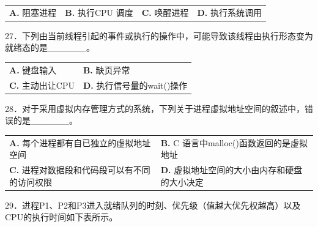 \documentclass[UTF8,11pt]{ctexart}
\begin{document}
\begin{center}\begin{tabular}{>{\raggedright\arraybackslash}p{\dimexpr(\linewidth-8\tabcolsep)/4\relax}>{\raggedright\arraybackslash}p{\dimexpr(\linewidth-8\tabcolsep)/4\relax}>{\raggedright\arraybackslash}p{\dimexpr(\linewidth-8\tabcolsep)/4\relax}>{\raggedright\arraybackslash}p{\dimexpr(\linewidth-8\tabcolsep)/4\relax}}
\textbf{A.} 阻塞进程 & \textbf{B.} 执行CPU 调度 & \textbf{C.} 唤醒进程 & \textbf{D.} 执行系统调用\\[.35em]\end{tabular}\end{center}

27．下列由当前线程引起的事件或执行的操作中，可能导致该线程由执行形态变为就绪态的是\_\_\_\_\_\_。


\begin{center}\begin{tabular}{>{\raggedright\arraybackslash}p{\dimexpr(\linewidth-4\tabcolsep)/2\relax}>{\raggedright\arraybackslash}p{\dimexpr(\linewidth-4\tabcolsep)/2\relax}}
\textbf{A.} 键盘输入 & \textbf{B.} 缺页异常\\[.35em]
\textbf{C.} 主动出让CPU & \textbf{D.} 执行信号量的wait()操作\\[.35em]\end{tabular}\end{center}

28．对于采用虚拟内存管理方式的系统，下列关于进程虚拟地址空间的叙述中，错误的是\_\_\_\_\_\_。


\begin{center}\begin{tabular}{>{\raggedright\arraybackslash}p{\dimexpr(\linewidth-4\tabcolsep)/2\relax}>{\raggedright\arraybackslash}p{\dimexpr(\linewidth-4\tabcolsep)/2\relax}}
\textbf{A.} 每个进程都有自已独立的虚拟地址空间 & \textbf{B.} C 语言中malloc()函数返回的是虚拟地址\\[.35em]
\textbf{C.} 进程对数据段和代码段可以有不同的访问权限 & \textbf{D.} 虚拟地址空间的大小由内存和硬盘的大小决定\\[.35em]\end{tabular}\end{center}

29．进程P1、P2和P3进入就绪队列的时刻、优先级（值越大优先权越高）以及CPU的执行时间如下表所示。
\end{document}
